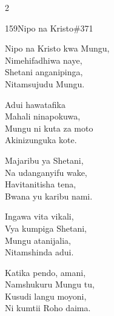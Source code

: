 \documentclass{article}
\begin{document}
\begin{multicols}{2}
\begin{hymn}{159}{Nipo na Kristo}{\#371}
\begin{stanza}
Nipo na Kristo kwa Mungu,\\
Nimehifadhiwa naye,\\
Shetani anganipinga,\\
Nitamsujudu Mungu.
\end{stanza}
\begin{chorus}
Adui hawatafika\\
Mahali ninapokuwa,\\
Mungu ni kuta za moto\\
Akinizunguka kote.
\end{chorus}
\begin{stanza}
Majaribu ya Shetani,\\
Na udanganyifu wake,\\
Havitanitisha tena,\\
Bwana yu karibu nami.
\end{stanza}
\begin{stanza}
Ingawa vita vikali,\\
Vya kumpiga Shetani,\\
Mungu atanijalia,\\
Nitamshinda adui.
\end{stanza}
\begin{stanza}
Katika pendo, amani,\\
Namshukuru Mungu tu,\\
Kusudi langu moyoni,\\
Ni kumtii Roho daima.
\end{stanza}
\end{hymn}


\end{multicols}
\end{document}
